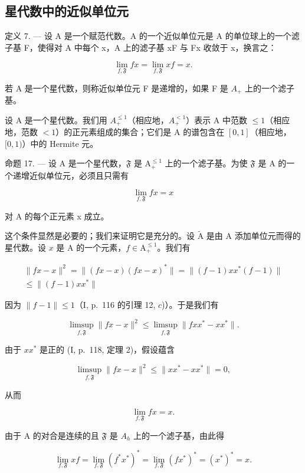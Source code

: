 \subsection{星代数中的近似单位元}

定义 7. --- 设 A 是一个赋范代数。A 的一个近似单位元是 A 的单位球上的一个滤子基 F，使得对 A 中每个 x，A 上的滤子基 xF 与 Fx 收敛于 x，换言之：

\[
\lim _ {f, \mathfrak {F}} f x = \lim _ {f, \mathfrak {F}} x f = x.
\]

若 A 是一个星代数，则称近似单位元 F 是递增的，如果 F 是 \(A_{+}\) 上的一个滤子基。

设 A 是一个星代数。我们用 \(A_{+}^{\leqslant1}\)（相应地，\(A_{+}^{<1}\)）表示 A 中范数 \(\leqslant 1\)（相应地，范数 \(< 1\)）的正元素组成的集合；它们是 A 的谱包含在 \([0,1]\)（相应地，\([0,1)\)）中的 Hermite 元。

命题 17. --- 设 A 是一个星代数，\(\mathfrak{F}\) 是 \(\mathrm{A}_{+}^{\leqslant 1}\) 上的一个滤子基。为使 \(\mathfrak{F}\) 是 A 的一个递增近似单位元，必须且只需有

\[
\lim _ {f, \mathfrak {F}} f x = x
\]

对 A 的每个正元素 x 成立。

这个条件显然是必要的；我们来证明它是充分的。设 \(\widetilde{\mathrm{A}}\) 是由 A 添加单位元而得的星代数。设 \(x\) 是 A 的一个元素，\(f \in \mathrm{A}_{+}^{\leqslant 1}\)。我们有

\[
\begin{array}{c} \| f x - x \| ^ {2} = \| (f x - x) (f x - x) ^ {*} \| = \| (f - 1) x x ^ {*} (f - 1) \| \\ \leqslant \| (f - 1) x x ^ {*} \| \end{array}
\]

因为 \(\| f - 1\| \leqslant 1\)（I, p.~116 的引理 12, \(c\))）。于是我们有

\[
\limsup _ {f, \mathfrak {F}} \| f x - x \| ^ {2} \leqslant \limsup _ {f, \mathfrak {F}} \| f x x ^ {*} - x x ^ {*} \|.
\]

由于 \(xx^{*}\) 是正的 (I, p.~118, 定理 2)，假设蕴含

\[
\limsup _ {f, \mathfrak {F}} \| f x - x \| ^ {2} \leqslant \| x x ^ {*} - x x ^ {*} \| = 0,
\]

从而

\[
\lim _ {f, \mathfrak {F}} f x = x.
\]

由于 A 的对合是连续的且 \(\mathfrak{F}\) 是 \(A_{h}\) 上的一个滤子基，由此得

\[
\lim _ {f, \mathfrak {F}} x f = \lim _ {f, \mathfrak {F}} (f ^ {*} x ^ {*}) ^ {*} = \lim _ {f, \mathfrak {F}} (f x ^ {*}) ^ {*} = (x ^ {*}) ^ {*} = x.
\]

